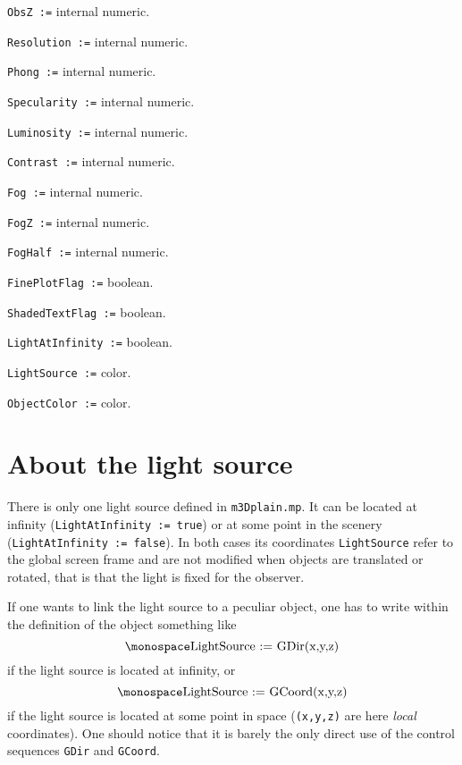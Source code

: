 
\item{\tt ObsZ :=} internal numeric.

\item{\tt Resolution :=} internal numeric.

\item{\tt Phong :=} internal numeric.

\item{\tt Specularity :=} internal numeric.

\item{\tt Luminosity :=} internal numeric.

\item{\tt Contrast :=} internal numeric.

\item{\tt Fog :=} internal numeric.

\item{\tt FogZ :=} internal numeric.

\item{\tt FogHalf :=} internal numeric.

\item{\tt FinePlotFlag :=} boolean.

\item{\tt ShadedTextFlag :=} boolean.

\item{\tt LightAtInfinity :=} boolean.

\item{\tt LightSource :=} color.

\item{\tt ObjectColor :=} color.

\endlist

\section{About the light source}

There is only one light source defined in {\tt m3Dplain.mp}.
It can be located at infinity ({\tt LightAtInfinity := true})
or at some point in the scenery ({\tt LightAtInfinity := false}).
In both cases its coordinates {\tt LightSource} refer to the
global screen frame and are not modified when objects are
translated or rotated, that is that the light is fixed
for the observer.

If one wants to link the light source to a peculiar object,
one has to write within the definition of the object something like
$$
	\hbox{\tt LightSource := GDir(x,y,z)}
$$
if the light source is located at infinity, or
$$
	\hbox{\tt LightSource := GCoord(x,y,z)}
$$
if the light source is located at some point in space
({\tt (x,y,z)} are here {\it local}\/ coordinates).
One should notice that it is barely the only direct use
of the control sequences {\tt GDir} and {\tt GCoord}.

